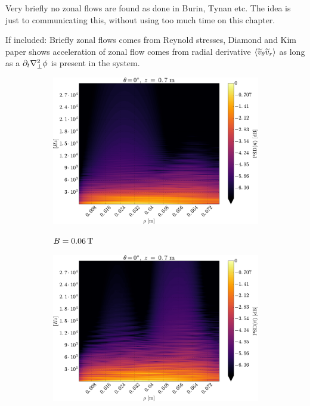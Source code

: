 Very briefly no zonal flows are found as done in Burin, Tynan etc.
The idea is just to communicating this, without using too much time on this chapter.

If included: Briefly zonal flows comes from Reynold stresses, Diamond and Kim paper shows acceleration of zonal flow comes from radial derivative $\langle{\widetilde{ v}_\theta\widetilde{ v}_r}\rangle$ as long as a $\partial_t \nabla_\perp^2 \phi$ is present in the system.
%
\begin{figure}[htbp]
    \centering
    \begin{subfigure}[h]{0.45\textwidth}
        \centering
        \includegraphics[width=1.0\textwidth]{fig/results/zonal/PSD2D006}
        \label{fig:PSD2D006}
        \caption{$B=0.06\, \text{T}$}
    \end{subfigure}%
    \hfill
    \begin{subfigure}[h]{0.45\textwidth}
        \centering
        \includegraphics[width=1.0\textwidth]{fig/results/zonal/PSD2D008}

\end{subfigure}
\end{figure}
